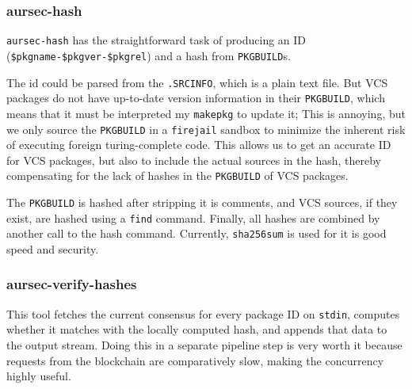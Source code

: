 \subsubsection{aursec-hash}
\texttt{aursec-hash} has the straightforward task of producing an ID (\texttt{\$pkgname-\$pkgver-\$pkgrel}) and a hash from \texttt{PKGBUILD}s.

The id could be parsed from the \texttt{.SRCINFO}, which is a plain text file.
But VCS packages do not have up-to-date version information in their \texttt{PKGBUILD}, which means that it must be interpreted my \texttt{makepkg} to update it; This is annoying, but we only source the \texttt{PKGBUILD} in a \texttt{firejail} sandbox to minimize the inherent risk of executing foreign turing-complete code.
This allows us to get an accurate ID for VCS packages, but also to include the actual sources in the hash, thereby compensating for the lack of hashes in the \texttt{PKGBUILD} of VCS packages.

The \texttt{PKGBUILD} is hashed after stripping it is comments, and VCS sources, if they exist, are hashed using a \texttt{find} command.
Finally, all hashes are combined by another call to the hash command.
Currently, \texttt{sha256sum} is used for it is good speed and security.

\subsubsection{aursec-verify-hashes}
This tool fetches the current consensus for every package ID on \texttt{stdin}, computes whether it matches with the locally computed hash, and appends that data to the output stream.
Doing this in a separate pipeline step is very worth it because requests from the blockchain are comparatively slow, making the concurrency highly useful.
